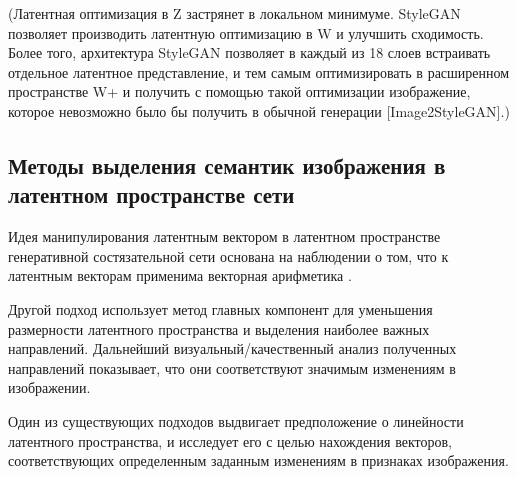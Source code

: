 (Латентная оптимизация в Z застрянет в локальном минимуме.
StyleGAN позволяет производить латентную оптимизацию в W и улучшить сходимость.
Более того, архитектура StyleGAN позволяет в каждый из 18 слоев встраивать отдельное латентное представление, и тем самым оптимизировать в расширенном пространстве W+ и получить с помощью такой оптимизации изображение, которое невозможно было бы получить в обычной генерации [Image2StyleGAN].)


\subsection{Методы выделения семантик изображения в латентном пространстве сети}
Идея манипулирования латентным вектором в латентном пространстве генеративной состязательной сети основана на наблюдении о том, что к латентным векторам применима векторная арифметика \cite{radford2015unsupervised}.

Другой подход \cite{hrknen2020ganspace} использует метод главных компонент для уменьшения размерности латентного пространства и выделения наиболее важных направлений. Дальнейший визуальный/качественный анализ полученных направлений показывает, что они соответствуют значимым изменениям в изображении.

Один из существующих подходов \cite{shen2020interfacegan} выдвигает предположение о линейности латентного пространства, и исследует его с целью нахождения векторов, соответствующих определенным заданным изменениям в признаках изображения.


